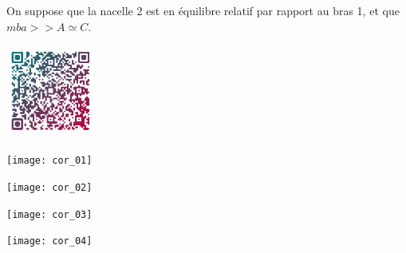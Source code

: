 On suppose que la nacelle 2 est en équilibre relatif par rapport au bras 1, et que $mba> > A \simeq C$.

\ifprof
\begin{corrige}
\end{corrige}
\else
\fi

\ifprof
\else
\begin{marginfigure}
\centering
\includegraphics[width=3cm]{Cy_04_03_PFD_CO_App_03_Centrifugeuse_qr}
\end{marginfigure}
\fi






\ifprof

\begin{center}
\texttt{[image: cor\_01]}
\end{center}

\begin{center}
\texttt{[image: cor\_02]}
\end{center}

\begin{center}
\texttt{[image: cor\_03]}
\end{center}

\begin{center}
\texttt{[image: cor\_04]}
\end{center}
\else
\fi